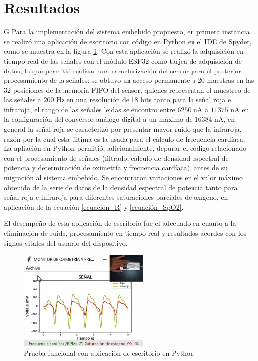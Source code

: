 \documentclass[journal]{IEEEtran}
\begin{document}
\section{Resultados}
{\color{blue}G}
Para la implementación del sistema embebido propuesto, en primera instancia se realizó una aplicación de escritorio con código en Python en el IDE de Spyder, como se muestra en la figura \ref{resultado_python_real}. Con esta aplicación se realizó la adquisición en tiempo real de las señales con el módulo ESP32 como tarjea de adquisición de datos, {\color{green} lo que permitió realizar una caracterización del sensor para el posterior procesamiento de la señales: 
se obtuvo un acceso permanente a 20 muestras en las 32 posiciones de la memoria FIFO del sensor, quienes representan el muestreo de las señales a $200$ Hz en una resolución de 18 bits tanto para la señal roja e infraroja, el rango de las señales leidas se encontro entre $6250$ nA a $11375$ nA en la configuración del conversor análogo digital a un máximo de $16384$ nA, en general la señal roja se caracterizó por presentar mayor ruido que la infraroja, razón por la cual esta última es la usada para el cálculo de frecuencia cardíaca.
 }
 La apliación en Python permitió, adicionalmente, depurar el código relacionado con el procesamiento de señales (filtrado, cálculo de densidad espectral de potencia y determinación de oximetría y frecuencia cardíaca), antes de su migración al sistema embebido. {\color{green}Se encontraron variaciones en el valor máximo obtenido de la serie de datos de la densidad espectral de potencia tanto para señal roja e infraroja para diferentes saturaciones parciales de oxígeno, en aplicación de la ecuación \ref{ecuación_R} y \ref{ecuación_SpO2}.}


El desempeño de esta aplicación de escritorio fue el adecuado en cuanto a la eliminación de ruido, procesamiento en tiempo real y resultados acordes con los signos vitales del usuario del dispositivo.


\begin{figure}[!h]
	\centering
	\includegraphics[width=2.5in]{resultado_python_real.png}
	\caption{Prueba funcional con aplicaciòn de escritorio en Python}
	\label{resultado_python_real}
\end{figure}
\end{document}
